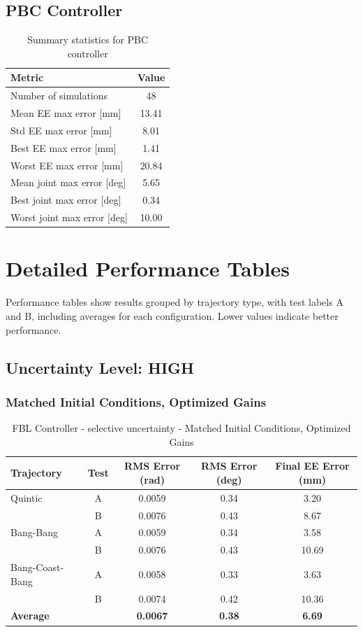 \documentclass[11pt,a4paper]{article}
\begin{document}
\subsection{PBC Controller}

\begin{table}[H]
\centering
\begin{tabular}{lc}
\toprule
Metric & Value \\
\midrule
Number of simulations & 48 \\
Mean EE max error [mm] & 13.41 \\
Std EE max error [mm] & 8.01 \\
Best EE max error [mm] & 1.41 \\
Worst EE max error [mm] & 20.84 \\
\midrule
Mean joint max error [deg] & 5.65 \\
Best joint max error [deg] & 0.34 \\
Worst joint max error [deg] & 10.00 \\
\bottomrule
\end{tabular}
\caption{Summary statistics for PBC controller}
\end{table}

\section{Detailed Performance Tables}

Performance tables show results grouped by trajectory type, with test labels A and B, including averages for each configuration. Lower values indicate better performance.

\subsection{Uncertainty Level: HIGH}

\subsubsection{Matched Initial Conditions, Optimized Gains}

\begin{table}[H]
\centering
\caption{FBL Controller - selective uncertainty - Matched Initial Conditions, Optimized Gains}
\begin{tabular}{lcccc}
\toprule
Trajectory & Test & RMS Error (rad) & RMS Error (deg) & Final EE Error (mm) \\
\midrule
Quintic & A & 0.0059 & 0.34 & 3.20 \\
 & B & 0.0076 & 0.43 & 8.67 \\
\midrule
Bang-Bang & A & 0.0059 & 0.34 & 3.58 \\
 & B & 0.0076 & 0.43 & 10.69 \\
\midrule
Bang-Coast-Bang & A & 0.0058 & 0.33 & 3.63 \\
 & B & 0.0074 & 0.42 & 10.36 \\
\midrule
\textbf{Average} & & \textbf{0.0067} & \textbf{0.38} & \textbf{6.69} \\
\bottomrule
\end{tabular}
\end{table}
\end{document}
